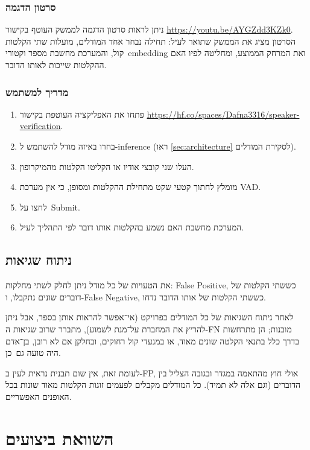 \documentclass[hebrew, a4paper]{article}
\theoremstyle{plain}
\theoremstyle{definition}
\numberwithin{equation}{section}
\begin{document}
\subsubsection{סרטון הדגמה}
\label{sec:video}

ניתן לראות סרטון הדגמה לממשק העוטף בקישור
\url{https://youtu.be/AYGZdd3KZk0}. הסרטון מציג את הממשק שתואר לעיל:
תחילה נבחר אחד המודלים, מועלות שתי הקלטות קול, והמערכת מחשבת מספר
וקטורי~embedding ואת המרחק הממוצע, ומחליטה לפיו האם ההקלטות שייכות
לאותו הדובר.

\subsubsection{מדריך למשתמש}
\label{sec:user-guide}

\begin{enumerate}
\item פתחו את האפליקציה העוטפת בקישור
  \url{https://hf.co/spaces/Dafna3316/speaker-verification}.
\item בחרו באיזה מודל להשתמש ל-inference (ראו \autoref{sec:architecture} לסקירת המודלים).
\item העלו שני קובצי אודיו או הקליטו הקלטות מהמיקרופון.
\item מומלץ לחתוך קטעי שקט מתחילת ההקלטות ומסופן, כי אין מערכת VAD.
\item לחצו על~Submit.
\item המערכת מחשבת האם נשמע בהקלטות אותו דובר לפי התהליך לעיל.
\end{enumerate}

\subsection{ניתוח שגיאות}
\label{sec:error-analysis}

את הטעויות של כל מודל ניתן לחלק לשתי מחלקות: False Positive, כששתי
הקלטות של דוברים שונים נתקבלו, ו-False Negative, כששתי הקלטות של אותו
הדובר נדחו.

לאחר ניתוח השגיאות של כל המודלים בפרויקט (אי־אפשר להראות אותן בספר,
אבל ניתן להריץ את המחברת על־מנת לשמוע), מתברר שרוב שגיאות ה-FN מובנות;
הן מתרחשות בדרך כלל בתנאי הקלטה שונים מאוד, או במנעדי קול רחוקים,
ובחלקן אם לא רובן, בן־אדם היה טועה גם~כן.

לעומת זאת, אין שום תבנית נראית לעין ב-FP, אולי חוץ מהתאמה במגדר ובגובה
הצליל בין הדוברים (וגם אלה לא תמיד). כל המודלים מקבלים לפעמים זוגות
הקלטות מאוד שונות בכל האופנים האפשריים.

\section{השוואת ביצועים}
\label{sec:performance}
\end{document}
